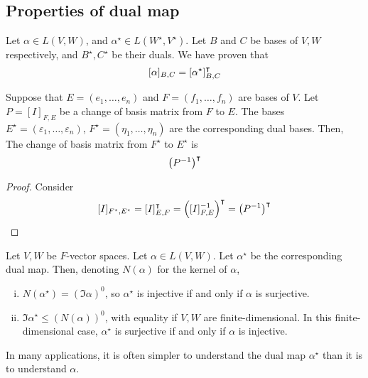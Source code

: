 \subsection{Properties of dual map}
Let \( \alpha \in L(V,W) \), and \( \alpha^\star \in L(W^\star, V^\star) \).
Let \( B \) and \( C \) be bases of \( V, W \) respectively, and \( B^\star, C^\star \) be their duals.
We have proven that
\[
	[\alpha]_{B,C} = [\alpha^\star]^\intercal_{B,C}
\]
\begin{lemma}
	Suppose that \( E = (e_1, \dots, e_n) \) and \( F = (f_1, \dots, f_n) \) are bases of \( V \).
	Let \( P = [I]_{F, E} \) be a change of basis matrix from \( F \) to \( E \).
	The bases \( E^\star = (\varepsilon_1, \dots, \varepsilon_n) \), \( F^\star = (\eta_1, \dots, \eta_n) \) are the corresponding dual bases.
	Then,
	The change of basis matrix from \( F^\star \) to \( E^\star \) is
	\[
		\qty(P^{-1})^\intercal
	\]
\end{lemma}
\begin{proof}
	Consider
	\[
		[I]_{F^\star, E^\star} = [I]^\intercal_{E, F} = \qty([I]_{F, E}^{-1})^\intercal = \qty(P^{-1})^\intercal
	\]
\end{proof}
\begin{lemma}
	Let \( V, W \) be \( F \)-vector spaces.
	Let \( \alpha \in L(V, W) \).
	Let \( \alpha^\star \) be the corresponding dual map.
	Then, denoting \( N(\alpha) \) for the kernel of \( \alpha \),
	\begin{enumerate}[(i)]
		\item \( N(\alpha^\star) = (\Im \alpha)^0 \), so \( \alpha^\star \) is injective if and only if \( \alpha \) is surjective.
		\item \( \Im \alpha^\star \leq (N(\alpha))^0 \), with equality if \( V, W \) are finite-dimensional.
		      In this finite-dimensional case, \( \alpha^\star \) is surjective if and only if \( \alpha \) is injective.
	\end{enumerate}
\end{lemma}
\begin{remark}
	In many applications, it is often simpler to understand the dual map \( \alpha^\star \) than it is to understand \( \alpha \).
\end{remark}
